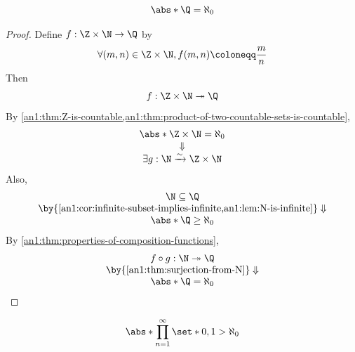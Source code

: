 \begin{theorem} \label{an1:thm:Q-is-countable}
  \[
    \abs*{\Q} = \aleph_{0}
  \]
\end{theorem}

\begin{proof}
  Define $f: \Z \times \N \to \Q$ by
  \[
    \forall (m, n) \in \Z \times \N, f(m, n) \coloneqq \frac{m}{n}
  \]
  Then
  \[
    f: \Z \times \N \twoheadrightarrow \Q
  \]
  By \cref{an1:thm:Z-is-countable,an1:thm:product-of-two-countable-sets-is-countable},
  \[
    \begin{array}{c}
      \abs*{\Z \times \N} = \aleph_{0} \\
      \Downarrow                       \\
      \exists g: \N \xrightarrow{\sim} \Z \times \N
    \end{array}
  \]
  Also,
  \[
    \begin{array}{c}
      \N \subseteq \Q                                                                       \\
      \by{\Cref{an1:cor:infinite-subset-implies-infinite,an1:lem:N-is-infinite}} \Downarrow \\
      \abs*{\Q} \geq \aleph_{0}
    \end{array}
  \]
  By \cref{an1:thm:properties-of-composition-functions},
  \[
    \begin{array}{c}
      f \circ g: \N \twoheadrightarrow \Q              \\
      \by{\Cref{an1:thm:surjection-from-N}} \Downarrow \\
      \abs*{\Q} = \aleph_{0}
    \end{array}
  \]
\end{proof}

\begin{lemma} \label{an1:lem:infinite-product-of-binary-set-is-uncountable}
  \[
    \abs*{\prod_{n = 1}^{\infty} \set*{0, 1}} > \aleph_{0}
  \]
\end{lemma}

